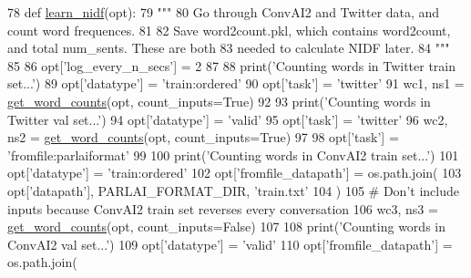 \begin{DoxyCode}
78 \textcolor{keyword}{def }\hyperlink{namespaceprojects_1_1controllable__dialogue_1_1controllable__seq2seq_1_1nidf_afcd3d0cbb49648e760e9875d32f53f19}{learn\_nidf}(opt):
79     \textcolor{stringliteral}{"""}
80 \textcolor{stringliteral}{    Go through ConvAI2 and Twitter data, and count word frequences.}
81 \textcolor{stringliteral}{}
82 \textcolor{stringliteral}{    Save word2count.pkl, which contains word2count, and total num\_sents. These are both}
83 \textcolor{stringliteral}{    needed to calculate NIDF later.}
84 \textcolor{stringliteral}{    """}
85 
86     opt[\textcolor{stringliteral}{'log\_every\_n\_secs'}] = 2
87 
88     print(\textcolor{stringliteral}{'Counting words in Twitter train set...'})
89     opt[\textcolor{stringliteral}{'datatype'}] = \textcolor{stringliteral}{'train:ordered'}
90     opt[\textcolor{stringliteral}{'task'}] = \textcolor{stringliteral}{'twitter'}
91     wc1, ns1 = \hyperlink{namespaceprojects_1_1controllable__dialogue_1_1controllable__seq2seq_1_1nidf_ad06ddb173f03a586d8c47c0c40f2f00c}{get\_word\_counts}(opt, count\_inputs=\textcolor{keyword}{True})
92 
93     print(\textcolor{stringliteral}{'Counting words in Twitter val set...'})
94     opt[\textcolor{stringliteral}{'datatype'}] = \textcolor{stringliteral}{'valid'}
95     opt[\textcolor{stringliteral}{'task'}] = \textcolor{stringliteral}{'twitter'}
96     wc2, ns2 = \hyperlink{namespaceprojects_1_1controllable__dialogue_1_1controllable__seq2seq_1_1nidf_ad06ddb173f03a586d8c47c0c40f2f00c}{get\_word\_counts}(opt, count\_inputs=\textcolor{keyword}{True})
97 
98     opt[\textcolor{stringliteral}{'task'}] = \textcolor{stringliteral}{'fromfile:parlaiformat'}
99 
100     print(\textcolor{stringliteral}{'Counting words in ConvAI2 train set...'})
101     opt[\textcolor{stringliteral}{'datatype'}] = \textcolor{stringliteral}{'train:ordered'}
102     opt[\textcolor{stringliteral}{'fromfile\_datapath'}] = os.path.join(
103         opt[\textcolor{stringliteral}{'datapath'}], PARLAI\_FORMAT\_DIR, \textcolor{stringliteral}{'train.txt'}
104     )
105     \textcolor{comment}{# Don't include inputs because ConvAI2 train set reverses every conversation}
106     wc3, ns3 = \hyperlink{namespaceprojects_1_1controllable__dialogue_1_1controllable__seq2seq_1_1nidf_ad06ddb173f03a586d8c47c0c40f2f00c}{get\_word\_counts}(opt, count\_inputs=\textcolor{keyword}{False})
107 
108     print(\textcolor{stringliteral}{'Counting words in ConvAI2 val set...'})
109     opt[\textcolor{stringliteral}{'datatype'}] = \textcolor{stringliteral}{'valid'}
110     opt[\textcolor{stringliteral}{'fromfile\_datapath'}] = os.path.join(

\end{DoxyCode}
